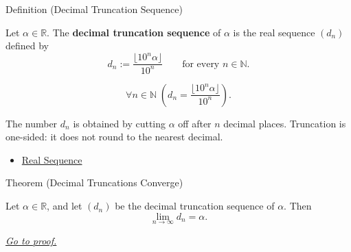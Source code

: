 
\begin{definitionbox}{Definition (Decimal Truncation Sequence)}
\begin{definition}
\label{def:decimal-truncation-sequence}
Let $\alpha\in\mathbb{R}$. The \textbf{decimal truncation sequence} of
$\alpha$ is the real sequence $(d_n)$ defined by
\[
  d_n:=\frac{\lfloor 10^n\alpha\rfloor}{10^n}
  \qquad\text{for every } n\in\mathbb{N}.
\]
\end{definition}
\end{definitionbox}

\begin{remark*}
\[
\forall n\in\mathbb{N}\;
\left(
  d_n=\frac{\lfloor 10^n\alpha\rfloor}{10^n}
\right).
\]
\end{remark*}

\begin{remark*}[Interpretation]
The number $d_n$ is obtained by cutting $\alpha$ off after $n$ decimal
places. Truncation is one-sided: it does not round to the nearest decimal.
\end{remark*}

\begin{dependencies}
\begin{itemize}
  \item \hyperref[def:real-sequence]{Real Sequence}
\end{itemize}
\end{dependencies}


\begin{theorembox}{Theorem (Decimal Truncations Converge)}
\begin{theorem}
\label{thm:decimal-truncations-converge}
Let $\alpha\in\mathbb{R}$, and let $(d_n)$ be the decimal truncation
sequence of $\alpha$. Then
\[
  \lim_{n\to\infty}d_n=\alpha.
\]

\smallskip
\noindent
\hyperref[prf:decimal-truncations-converge]{\textit{Go to proof.}}
\end{theorem}
\end{theorembox}

